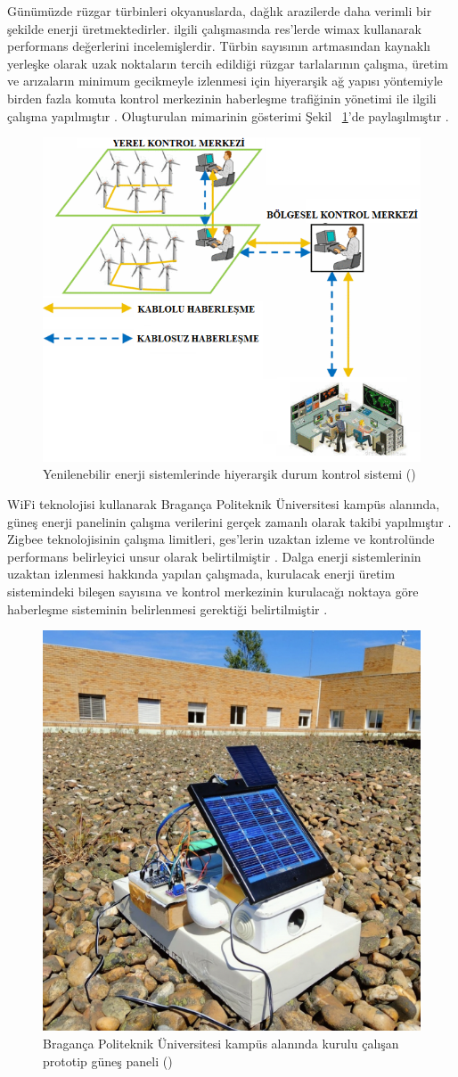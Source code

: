 Günümüzde rüzgar türbinleri okyanuslarda, dağlık arazilerde daha verimli bir şekilde enerji üretmektedirler. \cite{liu2010status} ilgili çalışmasında \gls{res}'lerde \gls{wimax} kullanarak performans değerlerini incelemişlerdir. Türbin sayısının artmasından kaynaklı yerleşke olarak uzak noktaların tercih edildiği rüzgar tarlalarının çalışma, üretim ve arızaların minimum gecikmeyle izlenmesi için hiyerarşik ağ yapısı yöntemiyle birden fazla komuta kontrol merkezinin haberleşme trafiğinin yönetimi ile ilgili çalışma yapılmıştır \cite{hussain2014multilayer}. Oluşturulan mimarinin gösterimi Şekil ~\ref{fig:figure6}'de paylaşılmıştır .






\begin{figure}[htbp]
\centerline{\includegraphics[width= 8 cm]{Resim/Screenshot 2022-06-12 at 21.27.08.png}}
\caption{Yenilenebilir enerji sistemlerinde hiyerarşik durum kontrol sistemi (\protect{}) }
\label{fig:figure6}
\end{figure}

WiFi teknolojisi kullanarak Bragança Politeknik Üniversitesi kampüs alanında, güneş enerji panelinin çalışma verilerini gerçek zamanlı olarak takibi yapılmıştır \cite{delly2022solar}.
Zigbee teknolojisinin çalışma limitleri, \gls{ges}'lerin uzaktan izleme ve kontrolünde performans belirleyici unsur olarak belirtilmiştir \cite{9670354}. Dalga enerji sistemlerinin uzaktan izlenmesi hakkında yapılan çalışmada, kurulacak enerji üretim sistemindeki bileşen sayısına ve kontrol merkezinin kurulacağı noktaya göre haberleşme sisteminin belirlenmesi gerektiği belirtilmiştir \cite{johanson2019condition}.



\begin{figure}[htbp]
\centerline{\includegraphics[width= 6 cm]{Resim/Screenshot 2022-09-29 at 16.05.17.png}}
\caption{Bragança Politeknik Üniversitesi kampüs alanında kurulu çalışan prototip güneş paneli (\protect{}) }
\label{fig:delly}
\end{figure}



